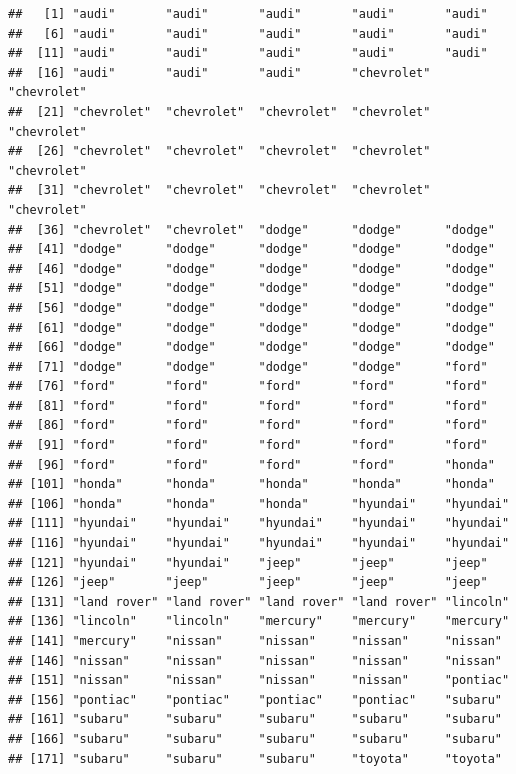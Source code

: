 \documentclass[
]{article}
\begin{document}
\begin{verbatim}
##   [1] "audi"       "audi"       "audi"       "audi"       "audi"      
##   [6] "audi"       "audi"       "audi"       "audi"       "audi"      
##  [11] "audi"       "audi"       "audi"       "audi"       "audi"      
##  [16] "audi"       "audi"       "audi"       "chevrolet"  "chevrolet" 
##  [21] "chevrolet"  "chevrolet"  "chevrolet"  "chevrolet"  "chevrolet" 
##  [26] "chevrolet"  "chevrolet"  "chevrolet"  "chevrolet"  "chevrolet" 
##  [31] "chevrolet"  "chevrolet"  "chevrolet"  "chevrolet"  "chevrolet" 
##  [36] "chevrolet"  "chevrolet"  "dodge"      "dodge"      "dodge"     
##  [41] "dodge"      "dodge"      "dodge"      "dodge"      "dodge"     
##  [46] "dodge"      "dodge"      "dodge"      "dodge"      "dodge"     
##  [51] "dodge"      "dodge"      "dodge"      "dodge"      "dodge"     
##  [56] "dodge"      "dodge"      "dodge"      "dodge"      "dodge"     
##  [61] "dodge"      "dodge"      "dodge"      "dodge"      "dodge"     
##  [66] "dodge"      "dodge"      "dodge"      "dodge"      "dodge"     
##  [71] "dodge"      "dodge"      "dodge"      "dodge"      "ford"      
##  [76] "ford"       "ford"       "ford"       "ford"       "ford"      
##  [81] "ford"       "ford"       "ford"       "ford"       "ford"      
##  [86] "ford"       "ford"       "ford"       "ford"       "ford"      
##  [91] "ford"       "ford"       "ford"       "ford"       "ford"      
##  [96] "ford"       "ford"       "ford"       "ford"       "honda"     
## [101] "honda"      "honda"      "honda"      "honda"      "honda"     
## [106] "honda"      "honda"      "honda"      "hyundai"    "hyundai"   
## [111] "hyundai"    "hyundai"    "hyundai"    "hyundai"    "hyundai"   
## [116] "hyundai"    "hyundai"    "hyundai"    "hyundai"    "hyundai"   
## [121] "hyundai"    "hyundai"    "jeep"       "jeep"       "jeep"      
## [126] "jeep"       "jeep"       "jeep"       "jeep"       "jeep"      
## [131] "land rover" "land rover" "land rover" "land rover" "lincoln"   
## [136] "lincoln"    "lincoln"    "mercury"    "mercury"    "mercury"   
## [141] "mercury"    "nissan"     "nissan"     "nissan"     "nissan"    
## [146] "nissan"     "nissan"     "nissan"     "nissan"     "nissan"    
## [151] "nissan"     "nissan"     "nissan"     "nissan"     "pontiac"   
## [156] "pontiac"    "pontiac"    "pontiac"    "pontiac"    "subaru"    
## [161] "subaru"     "subaru"     "subaru"     "subaru"     "subaru"    
## [166] "subaru"     "subaru"     "subaru"     "subaru"     "subaru"    
## [171] "subaru"     "subaru"     "subaru"     "toyota"     "toyota"    

\end{verbatim}
\end{document}
